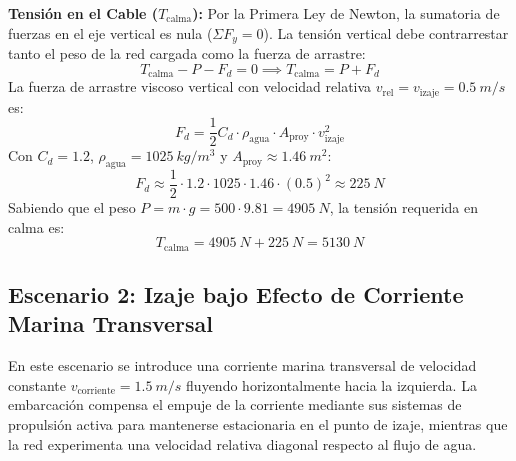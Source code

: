 \documentclass[11pt,a4paper]{article}
\begin{document}
\textbf{Tensión en el Cable ($T_{\text{calma}}$):}
    Por la Primera Ley de Newton, la sumatoria de fuerzas en el eje vertical es nula ($\Sigma F_y = 0$). La tensión vertical debe contrarrestar tanto el peso de la red cargada como la fuerza de arrastre:
    \begin{equation}\label{eq:eq_calma}
    T_{\text{calma}} - P - F_d = 0 \implies T_{\text{calma}} = P + F_d
    \end{equation}
    La fuerza de arrastre viscoso vertical con velocidad relativa $v_{\text{rel}} = v_{\text{izaje}} = \SI{0.5}{m/s}$ es:
    \begin{equation}\label{eq:drag_calma}
    F_d = \frac{1}{2} C_d \cdot \rho_{\text{agua}} \cdot A_{\text{proy}} \cdot v_{\text{izaje}}^2
    \end{equation}
    Con $C_d = 1.2$, $\rho_{\text{agua}} = \SI{1025}{kg/m^3}$ y $A_{\text{proy}} \approx \SI{1.46}{m^2}$:
    \begin{equation}\label{eq:drag_calma_num}
    F_d \approx \frac{1}{2} \cdot 1.2 \cdot 1025 \cdot 1.46 \cdot (0.5)^2 \approx \SI{225}{N}
    \end{equation}
    Sabiendo que el peso $P = m \cdot g = 500 \cdot 9.81 = \SI{4905}{N}$, la tensión requerida en calma es:
    \begin{equation}\label{eq:tension_calma_num}
    T_{\text{calma}} = \SI{4905}{N} + \SI{225}{N} = \SI{5130}{N}
    \end{equation}

\subsection{Escenario 2: Izaje bajo Efecto de Corriente Marina Transversal}
En este escenario se introduce una corriente marina transversal de velocidad constante $v_{\text{corriente}} = \SI{1.5}{m/s}$ fluyendo horizontalmente hacia la izquierda. La embarcación compensa el empuje de la corriente mediante sus sistemas de propulsión activa para mantenerse estacionaria en el punto de izaje, mientras que la red experimenta una velocidad relativa diagonal respecto al flujo de agua.
\end{document}
